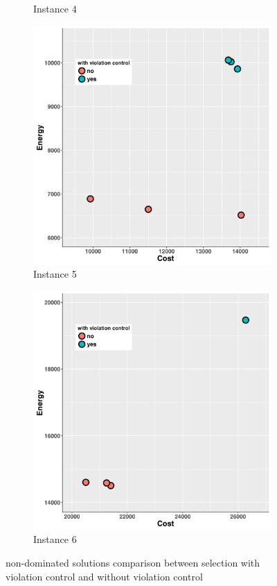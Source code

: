 \begin{figure}
\begin{subfigure}[b]{0.45\textwidth}
   \caption{Instance 4}
   \label{fig:d}
   \end{subfigure}
   \begin{subfigure}[b]{0.45\textwidth}\includegraphics[width=\textwidth]{pics/preliminary/5/evolve.png}
   \caption{Instance 5}
   \label{fig:e}
   \end{subfigure}
     \begin{subfigure}[b]{0.45\textwidth}\includegraphics[width=\textwidth]{pics/preliminary/6/evolve.png}
   \caption{Instance 6}
   \label{fig:f}
   \end{subfigure}
   \caption{non-dominated solutions comparison between selection with violation control and without violation control}
   \label{fig:dynamicFunctions}
\end{figure}


